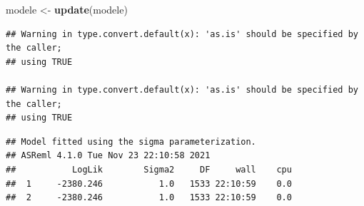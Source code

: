 \documentclass[
  12pt,
]{book}
\newenvironment{Shaded}{\begin{snugshade}}{\end{snugshade}}
\newcommand{\KeywordTok}[1]{\textcolor[rgb]{0.13,0.29,0.53}{\textbf{#1}}}
\newcommand{\NormalTok}[1]{#1}
\newcommand{\OperatorTok}[1]{\textcolor[rgb]{0.81,0.36,0.00}{\textbf{#1}}}
\newcommand{\StringTok}[1]{\textcolor[rgb]{0.31,0.60,0.02}{#1}}
\begin{document}
\begin{Shaded}
\begin{Highlighting}[]
\NormalTok{modele \textless{}{-}}\StringTok{ }\KeywordTok{update}\NormalTok{(modele)}
\end{Highlighting}
\end{Shaded}

\begin{verbatim}
## Warning in type.convert.default(x): 'as.is' should be specified by the caller;
## using TRUE

## Warning in type.convert.default(x): 'as.is' should be specified by the caller;
## using TRUE
\end{verbatim}

\begin{verbatim}
## Model fitted using the sigma parameterization.
## ASReml 4.1.0 Tue Nov 23 22:10:58 2021
##           LogLik        Sigma2     DF     wall    cpu
##  1     -2380.246           1.0   1533 22:10:59    0.0
##  2     -2380.246           1.0   1533 22:10:59    0.0
\end{verbatim}

\begin{Shaded}
\end{Shaded}
\end{document}
